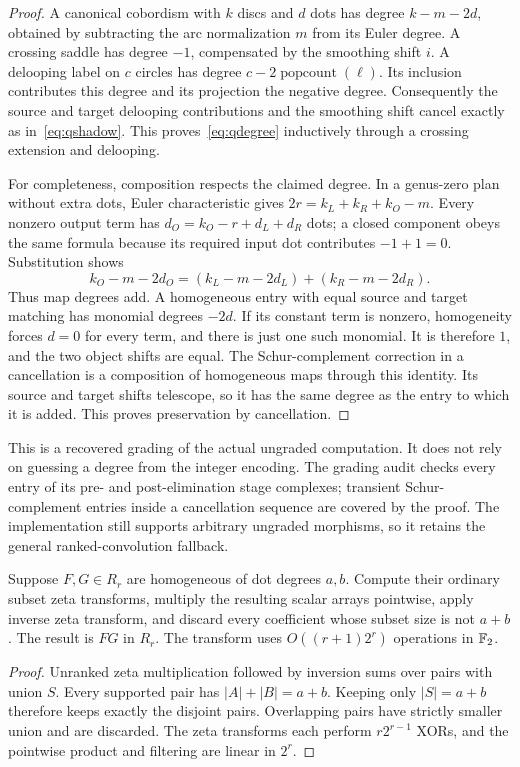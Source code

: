 \begin{proof}
A canonical cobordism with $k$ discs and $d$ dots has degree
$k-m-2d$, obtained by subtracting the arc normalization $m$ from its
Euler degree. A crossing saddle has degree $-1$, compensated by the
smoothing shift $i$. A delooping label on $c$ circles has degree
$c-2\operatorname{popcount}(\ell)$. Its inclusion contributes this
degree and its projection the negative degree. Consequently the source
and target delooping contributions and the smoothing shift cancel exactly
as in~\eqref{eq:qshadow}. This proves~\eqref{eq:qdegree} inductively
through a crossing extension and delooping.

For completeness, composition respects the claimed degree. In a
genus-zero plan without extra dots, Euler characteristic gives
$2r=k_L+k_R+k_O-m$. Every nonzero output term has
$d_O=k_O-r+d_L+d_R$ dots; a closed component obeys the same formula
because its required input dot contributes $-1+1=0$. Substitution shows
\[
 k_O-m-2d_O=(k_L-m-2d_L)+(k_R-m-2d_R).
\]
Thus map degrees add. A homogeneous entry with equal source and target
matching has monomial degrees $-2d$. If its constant term is nonzero,
homogeneity forces $d=0$ for every term, and there is just one such
monomial. It is therefore $1$, and the two object shifts are equal.
The Schur-complement correction in a cancellation is a composition of
homogeneous maps through this identity. Its source and target shifts
telescope, so it has the same degree as the entry to which it is added.
This proves preservation by cancellation.
\end{proof}

This is a recovered grading of the actual ungraded computation. It does
not rely on guessing a degree from the integer encoding. The grading
audit checks every entry of its pre- and post-elimination stage complexes;
transient Schur-complement entries inside a cancellation sequence are
covered by the proof. The implementation still supports arbitrary ungraded
morphisms, so it retains the general ranked-convolution fallback.

\begin{theorem}
\label{thm:homogeneous}
Suppose $F,G\in R_r$ are homogeneous of dot degrees $a,b$. Compute their
ordinary subset zeta transforms, multiply the resulting scalar arrays
pointwise, apply inverse zeta transform, and discard every coefficient
whose subset size is not $a+b$. The result is $FG$ in $R_r$. The
transform uses $O((r+1)2^r)$ operations in $\mathbb F_2$.
\end{theorem}
\begin{proof}
Unranked zeta multiplication followed by inversion sums over pairs with
union $S$. Every supported pair has $|A|+|B|=a+b$. Keeping only
$|S|=a+b$ therefore keeps exactly the disjoint pairs. Overlapping pairs
have strictly smaller union and are discarded. The zeta transforms each
perform $r2^{r-1}$ XORs, and the pointwise product and filtering are
linear in $2^r$.
\end{proof}

